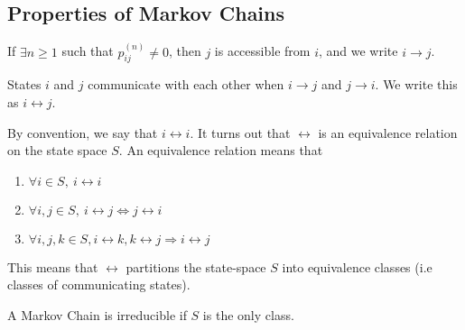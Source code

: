 \subsection{Properties of Markov Chains}
\begin{definition}
	If $\exists n \geq 1$ such that $p_{ij}^{(n)} \ne 0$, then $j$ is accessible from $i$, and we write $i\rightarrow j$.
	\label{defn:accesible}
\end{definition}
\begin{definition}
	States $i$ and $j$ communicate with each other when $i\rightarrow j$ and $j\rightarrow i$. We write this as $i\leftrightarrow j$.
	\label{defn:communicate}
\end{definition}
By convention, we say that $i\leftrightarrow i$.
It turns out that $\leftrightarrow$ is an equivalence relation on the state space $S$.
An equivalence relation means that 
\begin{enumerate}
	\item $\forall i\in S,\ i \leftrightarrow i$
	\item $\forall i,j\in S,\ i\leftrightarrow j \Leftrightarrow j \leftrightarrow i$
	\item $\forall i,j,k \in S, i\leftrightarrow k, k\leftrightarrow j \Rightarrow i \leftrightarrow j$
\end{enumerate}
This means that $\leftrightarrow$ partitions the state-space $S$ into equivalence classes (i.e classes of communicating states).
\begin{definition}
	A Markov Chain is irreducible if $S$ is the only class.
	\label{defn:irreducible-markov}
\end{definition}
